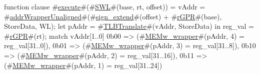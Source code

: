 function clause #\hyperref[zexecute]{execute}#(#\hyperref[zSWL]{SWL}#(base, rt, offset)) =
      {
        vAddr = #\hyperref[zaddrWrapperUnaligned]{addrWrapperUnaligned}#(#\hyperref[zsignzyextend]{sign\_extend}#(offset) + #\hyperref[zrGPR]{rGPR}#(base), StoreData, WL);
        let pAddr = #\hyperref[zTLBTranslate]{TLBTranslate}#(vAddr, StoreData) in
          {
            reg_val = #\hyperref[zrGPR]{rGPR}#(rt);
            match vAddr[1..0]
            {
              0b00  => (#\hyperref[zMEMwzywrapper]{MEMw\_wrapper}#(pAddr, 4) = reg_val[31..0]),
              0b01  => (#\hyperref[zMEMwzywrapper]{MEMw\_wrapper}#(pAddr, 3) = reg_val[31..8]),
              0b10  => (#\hyperref[zMEMwzywrapper]{MEMw\_wrapper}#(pAddr, 2) = reg_val[31..16]),
              0b11  => (#\hyperref[zMEMwzywrapper]{MEMw\_wrapper}#(pAddr, 1) = reg_val[31..24])
            }
          }
      }
